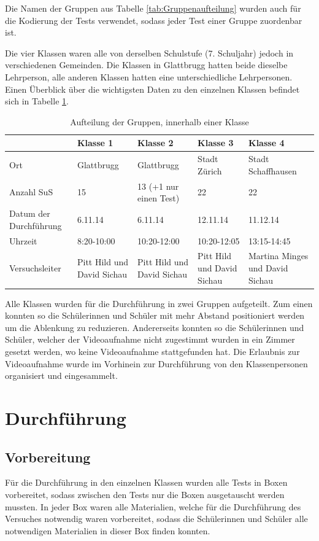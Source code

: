Die Namen der Gruppen aus Tabelle \ref{tab:Gruppenaufteilung} wurden auch für die Kodierung der Tests verwendet, sodass jeder Test einer Gruppe zuordenbar ist.

Die vier Klassen waren alle von derselben Schulstufe (7. Schuljahr) jedoch in verschiedenen Gemeinden. Die Klassen in Glattbrugg hatten beide dieselbe Lehrperson, alle anderen Klassen hatten eine unterschiedliche Lehrpersonen. Einen Überblick über die wichtigsten Daten zu den einzelnen Klassen befindet sich in Tabelle \ref{tab:Klassen}. 


\begin{table}[htbp]
  \centering
  \begin{tabular}{|p{2.3cm}|p{3cm}|p{3cm}|p{3cm}|p{3cm}|}
  \hline & Klasse 1 & Klasse 2 & Klasse 3 & Klasse 4 \\ 
  \hline Ort & Glattbrugg & Glattbrugg & Stadt Zürich & Stadt Schaffhausen \\
  \hline Anzahl SuS & 15 & 13 (+1 nur einen Test) & 22 & 22 \\
  \hline Datum der Durchführung & 6.11.14 & 6.11.14 & 12.11.14 & 11.12.14\\
  \hline Uhrzeit & 8:20-10:00 & 10:20-12:00& 10:20-12:05 & 13:15-14:45 \\
  \hline Versuchsleiter & Pitt Hild und David Sichau   & Pitt Hild und David Sichau  & Pitt Hild und David Sichau  & Martina Minges und David Sichau \\
  \hline
  \end{tabular} 
  \caption{Aufteilung der Gruppen, innerhalb einer Klasse}
  \label{tab:Klassen}
\end{table}

Alle Klassen wurden für die Durchführung in zwei Gruppen aufgeteilt. Zum einen konnten so die Schülerinnen und Schüler mit mehr Abstand positioniert werden um die Ablenkung zu reduzieren. Andererseits konnten so die Schülerinnen und Schüler, welcher der Videoaufnahme nicht zugestimmt wurden in ein Zimmer gesetzt werden, wo keine Videoaufnahme stattgefunden hat. Die Erlaubnis zur Videoaufnahme wurde im Vorhinein zur Durchführung von den Klassenpersonen organisiert und eingesammelt.



\section{Durchführung}

\subsection{Vorbereitung}
Für die Durchführung in den einzelnen Klassen wurden alle Tests in Boxen vorbereitet, sodass zwischen den Tests nur die Boxen ausgetauscht werden mussten. In jeder Box waren alle Materialien, welche für die Durchführung des Versuches notwendig waren vorbereitet, sodass die Schülerinnen und Schüler alle notwendigen Materialien in dieser Box finden konnten.  

